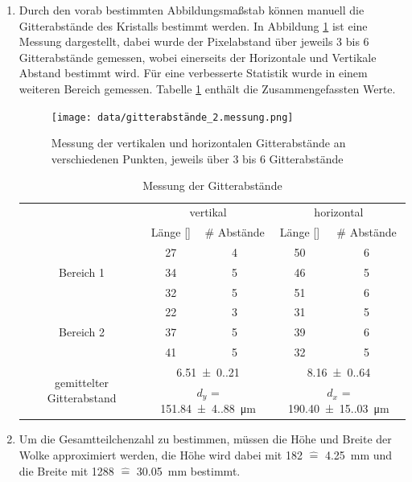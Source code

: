 \documentclass[12pt,a4paper,ngerman]{article}
\begin{document}
\begin{enumerate}[font=\bfseries]
\begin{enumerate}[font=\bfseries, label=\alph*)]
		\item Durch den vorab bestimmten Abbildungsmaßstab können manuell die Gitterabstände des Kristalls bestimmt werden. In Abbildung \ref{img:Abstände} ist eine Messung dargestellt, dabei wurde der Pixelabstand über jeweils 3 bis 6 Gitterabstände gemessen, wobei einerseits der Horizontale und Vertikale Abstand bestimmt wird. Für eine verbesserte Statistik wurde in einem weiteren Bereich gemessen. Tabelle \ref{table:Dimensionen} enthält die Zusammengefassten Werte. 
		\begin{figure}[ht]
			\centering
			\texttt{[image: data/gitterabstände\_2.messung.png]}		
			\caption{Messung der vertikalen und horizontalen Gitterabstände an verschiedenen Punkten, jeweils über 3 bis 6 Gitterabstände}
			\label{img:Abstände}
		\end{figure}
		\begin{table}[h!]
			\centering
			\begin{tabular}{c c c c c }
				\toprule[1.5pt]
				& \multicolumn{2}{c}{vertikal} & \multicolumn{2}{c}{horizontal} \\
				&  Länge [\si{\px}] & \# Abstände  &  Länge [\si{\px}] &\# Abstände\\
				\midrule
				\multirow{3}{*}{Bereich 1}      & 27  & 4  & 50 & 6  \\
				& 34  & 5  & 46 & 5  \\
				& 32  & 5  & 51 & 6  \\
				\midrule
				\multirow{3}{*}{Bereich 2}      & 22  & 3  & 31 & 5  \\
				& 37  & 5  & 39 & 6  \\
				& 41  & 5  & 32 & 5  \\
				\midrule
				\multirow{2}{*}{gemittelter Gitterabstand} 
				&\multicolumn{2}{c}{\SI{6.51(0.21)}{\px}} &\multicolumn{2}{c}{\SI{8.16(0.64)}{\px}}\\
				&\multicolumn{2}{c}{$d_y$ = \SI{151.84(4.88)}{\micro \meter}} &\multicolumn{2}{c}{$d_x$ = \SI{190.40(15.03)}{\micro \meter}}\\
				\bottomrule[1.5pt]
			\end{tabular}
			\caption{Messung der Gitterabstände}\label{table:Dimensionen}
		\end{table}
	\item Um die Gesamtteilchenzahl zu bestimmen, müssen die Höhe und Breite der Wolke approximiert werden, die Höhe wird dabei mit \SI{182}{\px} $\widehat{=}$ \SI{4.25}{\milli \meter} und die Breite mit \SI{1288}{\px} $\widehat{=}$ \SI{30.05}{\milli \meter} bestimmt.

\end{enumerate}
\end{enumerate}
\end{document}
